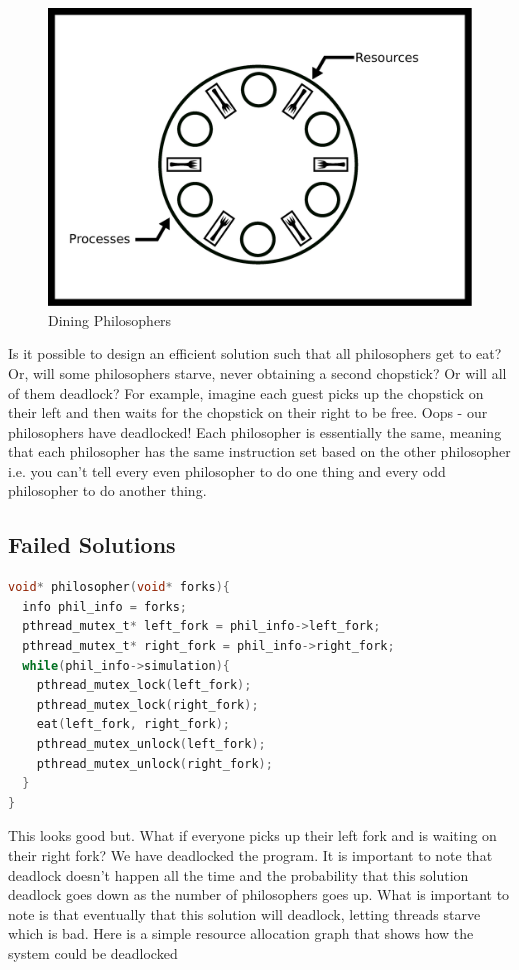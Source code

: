 \begin{figure}[H]
	\centering
	\includegraphics[width=.5\textwidth]{deadlock/drawings/dining.eps}
	\caption{Dining Philosophers}
\end{figure}

Is it possible to design an efficient solution such that all philosophers get to eat?
Or, will some philosophers starve, never obtaining a second chopstick?
Or will all of them deadlock?
For example, imagine each guest picks up the chopstick on their left and then waits for the chopstick on their right to be free.
Oops - our philosophers have deadlocked!
Each philosopher is essentially the same, meaning that each philosopher has the same instruction set based on the other philosopher i.e. you can't tell every even philosopher to do one thing and every odd philosopher to do another thing.

\subsection{Failed Solutions}

\begin{lstlisting}[language=C]
void* philosopher(void* forks){
  info phil_info = forks;
  pthread_mutex_t* left_fork = phil_info->left_fork;
  pthread_mutex_t* right_fork = phil_info->right_fork;
  while(phil_info->simulation){
    pthread_mutex_lock(left_fork);
    pthread_mutex_lock(right_fork);
    eat(left_fork, right_fork);
    pthread_mutex_unlock(left_fork);
    pthread_mutex_unlock(right_fork);
  }
}
\end{lstlisting}

This looks good but.
What if everyone picks up their left fork and is waiting on their right fork? We have deadlocked the program.
It is important to note that deadlock doesn't happen all the time and the probability that this solution deadlock goes down as the number of philosophers goes up.
What is important to note is that eventually that this solution will deadlock, letting threads starve which is bad.
Here is a simple resource allocation graph that shows how the system could be deadlocked

